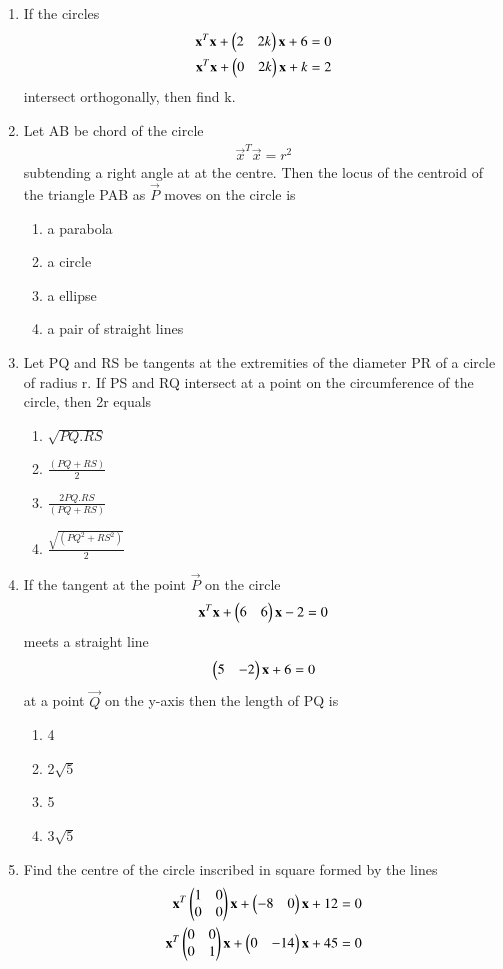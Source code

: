 \begin{enumerate}[label=\arabic*.,ref=\thesubsection.\theenumi]
\item If the circles 
\begin{align}
\mathbf{x}^T\mathbf{x}+\begin{pmatrix}2 & 2k\end{pmatrix}\mathbf{x}+6=0 \\
\mathbf{x}^T\mathbf{x}+\begin{pmatrix}0&2k\end{pmatrix}\mathbf{x}+k=2
\end{align} 
intersect orthogonally, then find k.

\item Let AB be chord of the circle 
\begin{align}
\vec{x}^T\vec{x}=r^2
\end{align} 
subtending a right angle at at the centre. Then the locus of the centroid of the triangle PAB as $\vec{P}$ moves on the circle is
\begin{enumerate}
\item a parabola
\item a circle
\item a ellipse
\item a pair of straight lines 
\end{enumerate}

\item Let PQ and RS be tangents at the extremities of the diameter PR of a circle of radius r. If PS and RQ intersect at a point on the circumference of the circle, then 2r equals
\begin{enumerate}
\item $\sqrt{PQ.RS}$
\item $\frac{(PQ+RS)}{2}$
\item $\frac{2PQ.RS}{(PQ+RS)}$
\item $\frac{\sqrt{(PQ^2+RS^2)}}{2}$ 
\end{enumerate}
    
\item If the tangent at the point $\vec{P}$ on the circle 
\begin{align}
\mathbf{x}^T\mathbf{x}+\begin{pmatrix}6&6\end{pmatrix}\mathbf{x}-2=0
\end{align}
meets a straight line 
\begin{align}
\begin{pmatrix}5&-2\end{pmatrix}\mathbf{x}+6=0
\end{align}
at a point $\vec{Q}$ on the y-axis then the length of PQ is
\begin{enumerate}
\item 4
\item 2$\sqrt{5}$
\item 5
\item 3$\sqrt{5}$ 
\end{enumerate}
    
\item Find the centre of the circle inscribed in square formed by the lines 
\begin{align}
\mathbf{x}^T\begin{pmatrix} 1 & 0 \\ 0 & 0\end{pmatrix}\mathbf{x}+\begin{pmatrix}-8&0\end{pmatrix}\mathbf{x}+12=0 \\
\mathbf{x}^T\begin{pmatrix}0 & 0 \\ 0 & 1\end{pmatrix}\mathbf{x}+\begin{pmatrix}0&-14\end{pmatrix}\mathbf{x} +45=0
\end{align}
   

\end{enumerate}
